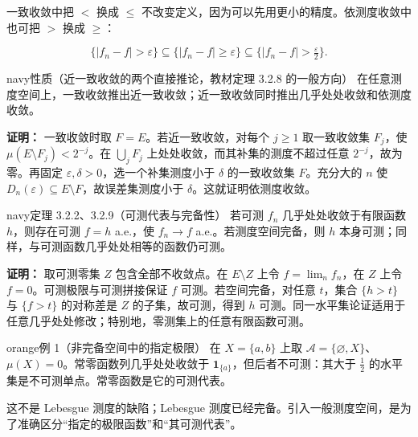 \documentclass[11pt,a4paper]{article}
\begin{document}
一致收敛中把 \(<\) 换成 \(\le\)
不改变定义，因为可以先用更小的精度。依测度收敛中也可把 \(>\) 换成
\(\ge\)：

\begin{equation*}
\{|f_n-f|>\varepsilon\}\subseteq\{|f_n-f|\ge\varepsilon\}
\subseteq\{|f_n-f|>\tfrac{\varepsilon}{2}\}.
\end{equation*}

\begin{sboxenv}{navy}{性质（近一致收敛的两个直接推论，教材定理 3.2.8 的一般方向）}
在任意测度空间上，一致收敛推出近一致收敛；近一致收敛同时推出几乎处处收敛和依测度收敛。

\end{sboxenv}

\textbf{证明：} 一致收敛时取 \(F=E\)。若近一致收敛，对每个 \(j\ge1\)
取一致收敛集 \(F_j\)，使 \(\mu(E\setminus F_j)<2^{-j}\)。在
\(\bigcup_jF_j\) 上处处收敛，而其补集的测度不超过任意
\(2^{-j}\)，故为零。再固定 \(\varepsilon,\delta>0\)，选一个补集测度小于
\(\delta\) 的一致收敛集 \(F\)。充分大的 \(n\) 使
\(D_n(\varepsilon)\subseteq E\setminus F\)，故误差集测度小于
\(\delta\)。这就证明依测度收敛。

\begin{sboxenv}{navy}{定理 3.2.2、3.2.9（可测代表与完备性）}
若可测 \(f_n\) 几乎处处收敛于有限函数 \(h\)，则存在可测 \(f=h\) a.e.，使
\(f_n\to f\) a.e.。若测度空间完备，则 \(h\)
本身可测；同样，与可测函数几乎处处相等的函数仍可测。

\end{sboxenv}

\textbf{证明：} 取可测零集 \(Z\) 包含全部不收敛点。在 \(E\setminus Z\)
上令 \(f=\lim_n f_n\)，在 \(Z\) 上令 \(f=0\)。可测极限与可测拼接保证
\(f\) 可测。若空间完备，对任意 \(t\)，集合 \(\{h>t\}\) 与 \(\{f>t\}\)
的对称差是 \(Z\) 的子集，故可测，得到 \(h\)
可测。同一水平集论证适用于任意几乎处处修改；特别地，零测集上的任意有限函数可测。

\begin{sboxenv}{orange}{例 1（非完备空间中的指定极限）}
在 \(X=\{a,b\}\) 上取
\(\mathcal A=\{\varnothing,X\}\)、\(\mu(X)=0\)。常零函数列几乎处处收敛于
\(\mathbf1_{\{a\}}\)，但后者不可测：其大于 \(\frac12\)
的水平集是不可测单点。常零函数是它的可测代表。

\end{sboxenv}

这不是 Lebesgue 测度的缺陷；Lebesgue
测度已经完备。引入一般测度空间，是为了准确区分``指定的极限函数''和``其可测代表''。
\end{document}
